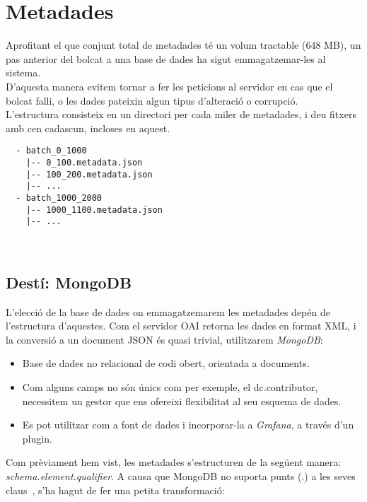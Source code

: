 \section{Metadades}\label{sec:metadata-storing}

Aprofitant el que conjunt total de metadades té un volum tractable (648 MB), un pas anterior del bolcat a una base de dades ha sigut emmagatzemar-les al sistema. \\

\noindent
D’aquesta manera evitem tornar a fer les peticions al servidor en cas que el bolcat falli, o les dades pateixin algun tipus d’alteració o corrupció. \\

\noindent
L’estructura consisteix en un directori per cada miler de metadades, i deu fitxers amb cen cadascun, incloses en aquest.

\begin{verbatim}
  - batch_0_1000
    |-- 0_100.metadata.json
    |-- 100_200.metadata.json
    |-- ...
  - batch_1000_2000
    |-- 1000_1100.metadata.json
    |-- ...
\end{verbatim}

\noindent \\
\subsection{Destí: MongoDB}\label{subsec:metadata-db-mongodb}

L'elecció de la base de dades on emmagatzemarem les metadades depén de l'estructura d'aquestes.
Com el servidor \gls{OAI} retorna les dades en format \gls{XML}, i la conversió a un document \gls{JSON} és quasi trivial, utilitzarem \textit{MongoDB}:

\begin{itemize}
  \item Base de dades no relacional de codi obert, orientada a documents.
  \item Com alguns camps no són únics com per exemple, el dc.contributor, necessitem un gestor que ens ofereixi flexibilitat al seu esquema de dades.
  \item Es pot utilitzar com a font de dades i incorporar-la a \textit{Grafana}, a través d’un \gls{plugin}.
\end{itemize}

\noindent
Com prèviament hem vist, les metadades s’estructuren de la següent manera: \textit{schema.element.qualifier}.
A causa que MongoDB no suporta punts (.) a les seves claus~\cite{mongodb:key-restrictions}, s’ha hagut de fer una petita transformació:

